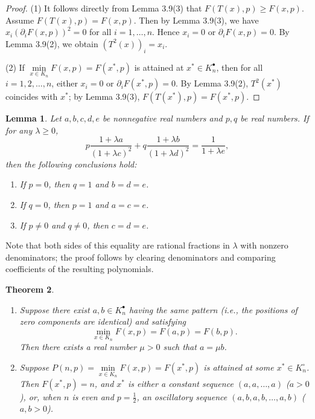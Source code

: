 \documentclass[a4paper,fleqn,numbers]{cas-sc}
\newtheorem{theorem}{Theorem}[section]
\newtheorem{lemma}[theorem]{Lemma}
\begin{document}
	\begin{proof}
		(1) It follows directly from Lemma 3.9(3) that $F(T(x),p) \geq F(x,p)$. Assume $F(T(x),p) = F(x,p)$. Then by Lemma 3.9(3), we have $x_i (\partial_i F(x,p))^2 = 0$ for all $i=1,\ldots,n$. Hence $x_i = 0$ or $\partial_i F(x,p) = 0$. By Lemma 3.9(2), we obtain $(T^2(x))_i = x_i$.
		
		(2) If $\min\limits_{x \in {K}_n} F(x,p) = F(x^* ,p)$ is attained at $x^* \in K_n^{\bullet}$, then for all $i=1,2,\ldots,n$, either $x_i = 0$ or $\partial_i F(x^*,p) = 0$. By Lemma 3.9(2), $T^2(x^*)$ coincides with $x^*$; by Lemma 3.9(3), $F(T(x^*),p) = F(x^*,p)$.
	\end{proof}
	
	\begin{lemma}
		Let $a, b, c, d, e$ be nonnegative real numbers and $p, q$ be real numbers. If for any $\lambda \geq 0$,
		\[
		p \frac{1 + \lambda a}{(1 + \lambda c)^2} + q \frac{1 + \lambda b}{(1 + \lambda d)^2} = \frac{1}{1 + \lambda e},\tag{3.5}
		\]
		then the following conclusions hold:
		\begin{enumerate}
			\item If $p = 0$, then $q = 1$ and $b = d = e$.
			\item If $q = 0$, then $p = 1$ and $a = c = e$.
			\item If $p \neq 0$ and $q \neq 0$, then $c = d = e$.
		\end{enumerate}
	\end{lemma}
	
	Note that both sides of this equality are rational fractions in $\lambda$ with nonzero denominators; the proof follows by clearing denominators and comparing coefficients of the resulting polynomials.
	
	\begin{theorem}
		\begin{enumerate}
			\item Suppose there exist $a, b \in K_n^{\bullet}$ having the same pattern (i.e., the positions of zero components are identical) and satisfying
			\[
			\min_{x \in K_n} F(x,p) = F(a,p) = F(b,p).
			\]
			Then there exists a real number $\mu > 0$ such that $a = \mu b$.
			\item Suppose $P(n,p)=\min\limits_{x \in K_n} F(x,p) = F(x^*,p)$ is attained at some $x^* \in K_n^\circ$. Then $F(x^*,p) = n$, and $x^*$ is either a constant sequence $(a,a,\dots,a)$ ($a>0$), or, when $n$ is even and $p=\frac{1}{2}$, an oscillatory sequence $(a,b,a,b,\dots,a,b)$ ($a,b>0$).
		\end{enumerate}
	\end{theorem}
	
\end{document}
